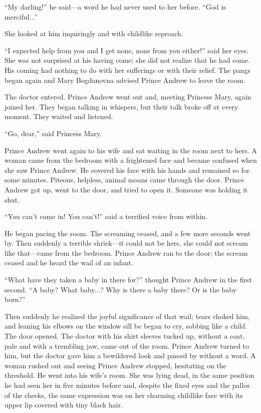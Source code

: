 ``My darling!'' he said---a word he had never used to her
before. ``God is merciful...''

She looked at him inquiringly and with childlike reproach.

``I expected help from you and I get none, none from you
either!'' said her eyes. She was not surprised at his having
come; she did not realize that he had come. His coming had
nothing to do with her sufferings or with their relief. The pangs
began again and Mary Bogdanovna advised Prince Andrew to leave
the room.

The doctor entered. Prince Andrew went out and, meeting Princess
Mary, again joined her. They began talking in whispers, but their
talk broke off at every moment. They waited and listened.

``Go, dear,'' said Princess Mary.

Prince Andrew went again to his wife and sat waiting in the room
next to hers. A woman came from the bedroom with a frightened
face and became confused when she saw Prince Andrew. He covered
his face with his hands and remained so for some
minutes. Piteous, helpless, animal moans came through the
door. Prince Andrew got up, went to the door, and tried to open
it. Someone was holding it shut.

``You can't come in! You can't!'' said a terrified voice from
within.

He began pacing the room. The screaming ceased, and a few more
seconds went by. Then suddenly a terrible shriek---it could not
be hers, she could not scream like that---came from the
bedroom. Prince Andrew ran to the door; the scream ceased and he
heard the wail of an infant.

``What have they taken a baby in there for?'' thought Prince
Andrew in the first second. ``A baby? What baby...? Why is there
a baby there? Or is the baby born?''

Then suddenly he realized the joyful significance of that wail;
tears choked him, and leaning his elbows on the window sill be
began to cry, sobbing like a child. The door opened. The doctor
with his shirt sleeves tucked up, without a coat, pale and with a
trembling jaw, came out of the room. Prince Andrew turned to him,
but the doctor gave him a bewildered look and passed by without a
word. A woman rushed out and seeing Prince Andrew stopped,
hesitating on the threshold. He went into his wife's room. She
was lying dead, in the same position he had seen her in five
minutes before and, despite the fixed eyes and the pallor of the
cheeks, the same expression was on her charming childlike face
with its upper lip covered with tiny black hair.

